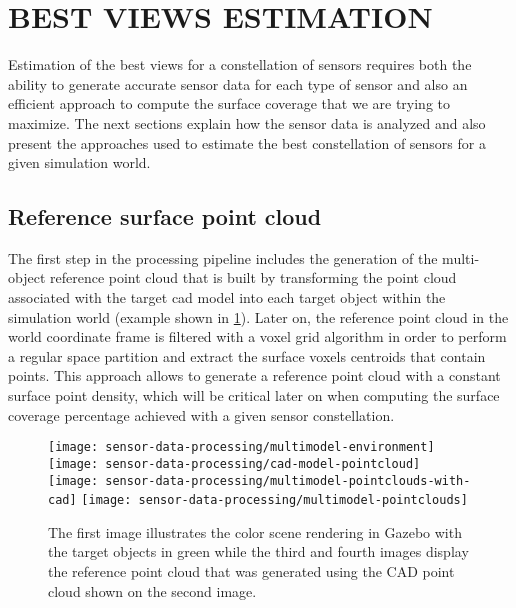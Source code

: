 \section{\uppercase{Best views estimation}}\label{sec:best-views-estimation}

\noindent Estimation of the best views for a constellation of sensors requires both the ability to generate accurate sensor data for each type of sensor and also an efficient approach to compute the surface coverage that we are trying to maximize. The next sections explain how the sensor data is analyzed and also present the approaches used to estimate the best constellation of sensors for a given simulation world.

\subsection{Reference surface point cloud}

The first step in the processing pipeline includes the generation of the multi-object reference point cloud that is built by transforming the point cloud associated with the target \gls{cad} model into each target object within the simulation world (example shown in \cref{fig:reference-cloud}). Later on, the reference point cloud in the world coordinate frame is filtered with a voxel grid algorithm in order to perform a regular space partition and extract the surface voxels centroids that contain points. This approach allows to generate a reference point cloud with a constant surface point density, which will be critical later on when computing the surface coverage percentage achieved with a given sensor constellation.

\begin{figure}
	\centering
	\texttt{[image: sensor-data-processing/multimodel-environment]}\hspace{2em}
	\texttt{[image: sensor-data-processing/cad-model-pointcloud]}
	\texttt{[image: sensor-data-processing/multimodel-pointclouds-with-cad]}\hspace{2em}
	\texttt{[image: sensor-data-processing/multimodel-pointclouds]}
	\caption{The first image illustrates the color scene rendering in Gazebo with the target objects in green while the third and fourth images display the reference point cloud that was generated using the CAD point cloud shown on the second image.}
	\label{fig:reference-cloud}
\end{figure}


